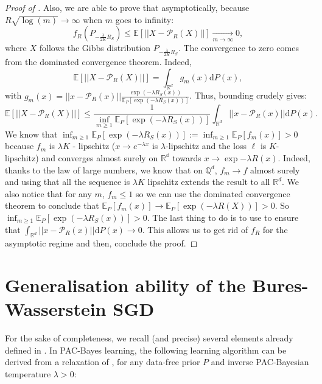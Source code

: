 \begin{proof}[Proof of ]
\noindent Also, we are able to prove that asymptotically, because $R \sqrt{\log(m)}\rightarrow \infty$ when $m$ goes to infinity:
$$f_R(P_{-\frac{\lambda}{2K} R_S}) \leq \mathbb{E}[||X-\mathcal{P}_R(X)||] \underset{m\rightarrow \infty}{\rightarrow} 0,    $$
where $X$ follows the Gibbs distribution $P_{-\frac{\lambda}{2K} R_S}$. The convergence to zero comes from the dominated convergence theorem.
Indeed,
\[ \mathbb{E}[||X-\mathcal{P}_R(X)||] = \int_{\mathbb{R}^d} g_m(x) \mathrm{d}P(x), \]
with $g_m(x)= ||x - \mathcal{P}_R(x)||\frac{\exp\left(-\lambda R_S(x) \right)}{\mathbb{E}_P[\exp\left(-\lambda R_S(x) \right)]}$. Thus, bounding crudely gives:
\[  \mathbb{E}[||X-\mathcal{P}_R(X)||] \leq \frac{1}{\inf_{m\geq 1} \mathbb{E}_P[\exp\left(-\lambda R_S(x) \right)]} \int_{\mathbb{R}^d} ||x - \mathcal{P}_R(x)|| \mathrm{d}P(x).\]
We know that $\inf_{m\geq 1} \mathbb{E}_P[\exp\left(-\lambda R_S(x) \right)] := \inf_{m\geq 1} \mathbb{E}_P[f_m(x) ] >0$ because $f_m$ is $\lambda K$ - lipschitz ($x \rightarrow e^{- \lambda x}$ is $\lambda$-lipschitz and the loss $\ell$ is $K$-lipschitz)
and converges almost surely on $\mathbb{R^d}$ towards $x\rightarrow \exp{-\lambda R(x)}$. Indeed, thanks to the law of large numbers, we know that on $\mathbb{Q}^d$, $f_m \rightarrow f$ almost surely and using that all the sequence is $\lambda K$ lipschitz extends the result to all $\mathbb{R}^d$.
We also notice that for any $m$, $f_m \leq 1$ so we can use the dominated convergence theorem to conclude that $\mathbb{E}_P[f_m(x)] \rightarrow  \mathbb{E}_P[\exp(-\lambda R(X)) ] >0.$ So $\inf_{m\geq 1} \mathbb{E}_P[\exp\left(-\lambda R_S(x) \right)]>0$.
The last thing to do is to use  to ensure that $\int_{\mathbb{R}^d} ||x - \mathcal{P}_R(x)|| \mathrm{d}P(x) \rightarrow 0$.
This allows us to get rid of $f_R$ for the asymptotic regime and then, conclude the proof.
\end{proof}



\section{Generalisation ability of the Bures-Wasserstein SGD}

\label{sec: gene_sgd}

For the sake of completeness, we recall (and precise) several elements already defined in .
In PAC-Bayes learning, the following learning algorithm can be derived from a relaxation of \citet[][Theorem 1.2.6]{catoni2007pac}, for any data-free prior $P$ and inverse PAC-Bayesian temperature $\lambda>0$:

